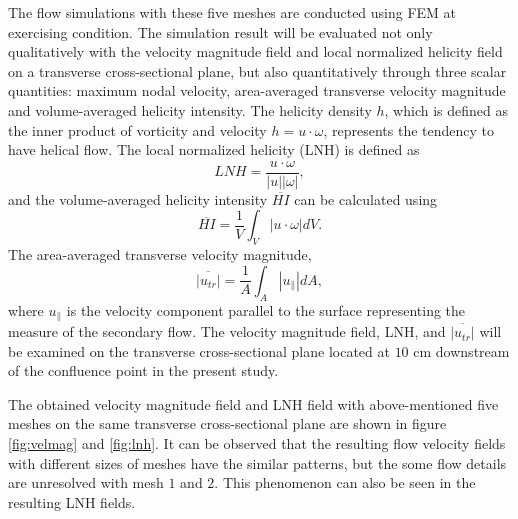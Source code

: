 The flow simulations with these five meshes are conducted using FEM at exercising condition. The simulation result will be evaluated not only qualitatively with the velocity magnitude field and local normalized helicity field on a transverse cross-sectional plane, but also quantitatively through three scalar quantities: maximum nodal velocity, area-averaged transverse velocity magnitude and volume-averaged helicity intensity. The helicity density $h$, which is defined as the inner product of vorticity and velocity $h=u\cdot\omega$, represents the tendency to have helical flow. The local normalized helicity (LNH) is defined as
\begin{equation}
LNH=\frac{u\cdot\omega}{\left|u\right|\left|\omega\right|},
\label{eq:LNH}
\end{equation}
and the volume-averaged helicity intensity $\overline{HI}$ can be calculated using
\begin{equation}
\overline{HI}=\frac{1}{V}\int_V \left|u\cdot\omega\right| dV.
\label{eq:HI}
\end{equation}
The area-averaged transverse velocity magnitude,
\begin{equation}
\overline{\left|u_{tr}\right|}=\frac{1}{A}\int_A \left|u _\|\right| dA,
\label{eq:utr}
\end{equation}
where $u _\|$ is the velocity component parallel to the surface representing the measure of the secondary flow. The velocity magnitude field, LNH, and $\overline{\left|u_{tr}\right|}$ will be examined on the transverse cross-sectional plane located at $10$ cm downstream of the confluence point in the present study.  

The obtained velocity magnitude field and LNH field with above-mentioned five meshes on the same transverse cross-sectional plane are shown in figure \ref{fig:velmag} and \ref{fig:lnh}. It can be observed that the resulting flow velocity fields with different sizes of meshes have the similar patterns, but the some flow details are unresolved with mesh $1$ and $2$. This phenomenon can also be seen in the resulting LNH fields.

